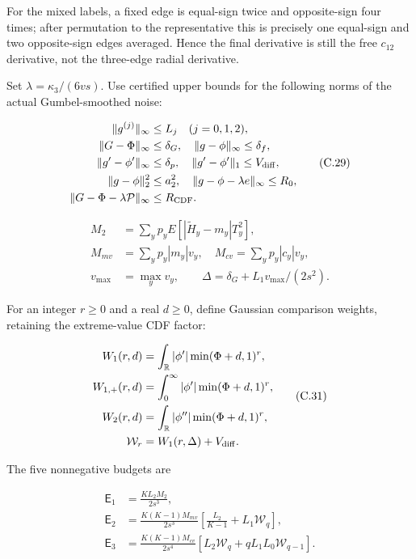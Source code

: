 \documentclass{article}
\begin{document}
For the mixed labels, a fixed edge is equal-sign twice and opposite-sign
four times; after permutation to the representative this is precisely
one equal-sign and two opposite-sign edges averaged. Hence the final
derivative is still the free \(c_{12}\) derivative, not the three-edge
radial derivative.

Set \(\lambda=\kappa_3/(6vs)\). Use certified upper bounds for the
following norms of the actual Gumbel-smoothed noise:

\[
\begin{aligned}
\|g^{(j)}\|_\infty&\le L_j\quad(j=0,1,2),\\
\|G-\Phi\|_\infty&\le\delta_G,\quad \|g-\phi\|_\infty\le\delta_f,\\
\|g'-\phi'\|_\infty&\le\delta_p,\quad \|g'-\phi'\|_1\le V_{\rm diff},\\
\|g-\phi\|_2^2&\le a_2^2,\quad \|g-\phi-\lambda e\|_\infty\le R_0,\\
\|G-\Phi-\lambda\mathcal P\|_\infty&\le R_{\rm CDF}.
\end{aligned}
\tag{C.29}
\]

\[
\begin{aligned}
M_2&=\sum_yp_yE[|\widetilde H_y-m_y|T_y^2],\\
M_{mv}&=\sum_yp_y|m_y|v_y,\quad M_{cv}=\sum_yp_y|c_y|v_y,\\
v_{\max}&=\max_yv_y,\qquad \Delta=\delta_G+L_1v_{\max}/(2s^2).
\end{aligned}
\tag{C.30}
\]

For an integer \(r\ge0\) and a real \(d\ge0\), define Gaussian
comparison weights, retaining the extreme-value CDF factor:

\[
\begin{aligned}
W_1(r,d)&=\int_{\mathbb R}|\phi'|\min(\Phi+d,1)^r,\\
W_{1,+}(r,d)&=\int_0^\infty|\phi'|\min(\Phi+d,1)^r,\\
W_2(r,d)&=\int_{\mathbb R}|\phi''|\min(\Phi+d,1)^r,\\
\mathcal W_r&=W_1(r,\Delta)+V_{\rm diff}.
\end{aligned}
\tag{C.31}
\]

The five nonnegative budgets are

\[
\begin{aligned}
\mathsf E_1&=\frac{KL_2M_2}{2s^3},\\
\mathsf E_2&=\frac{K(K-1)M_{mv}}{2s^3}
\left[\frac{L_2}{K-1}+L_1\mathcal W_q\right],\\
\mathsf E_3&=\frac{K(K-1)M_{cv}}{2s^4}
\left[L_2\mathcal W_q+qL_1L_0\mathcal W_{q-1}\right].
\end{aligned}
\tag{C.32}
\]
\end{document}
